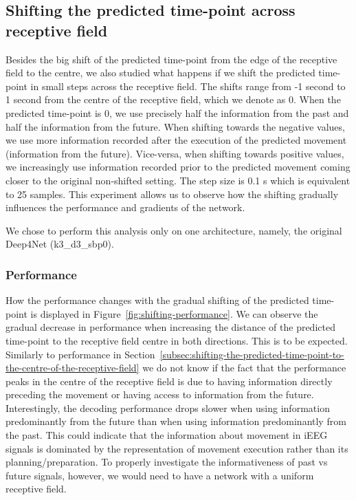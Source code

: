 \subsection{Shifting the predicted time-point across receptive field}\label{subsec:shifting-the-predicted-time-point-across-receptive-field}
Besides the big shift of the predicted time-point from the edge of the receptive field to the centre, we also studied what happens if we shift the predicted time-point in small steps across the receptive field. 
The shifts range from  -1 second to 1 second from the centre of the receptive field, which we denote as 0.
When the predicted time-point is 0, we use precisely half the information from the past and half the information from the future.
When shifting towards the negative values, we use more information recorded after the execution of the predicted movement (information from the future). 
Vice-versa, when shifting towards positive values, we increasingly use information recorded prior to the predicted movement coming closer to the original non-shifted setting.  
The step size is 0.1 s which is equivalent to 25 samples.
This experiment allows us to observe how the shifting gradually influences the performance and gradients of the network. 

We chose to perform this analysis only on one architecture, namely, the original Deep4Net (k3\_d3\_sbp0). 

\subsubsection{Performance}\label{subsubsec:across-shiftig-performace}
How the performance changes with the gradual shifting of the predicted time-point is displayed in Figure~\ref{fig:shifting-performance}.
We can observe the gradual decrease in performance when increasing the distance of the predicted time-point to the receptive field centre in both directions. 
This is to be expected. 
Similarly to performance in Section~\ref{subsec:shifting-the-predicted-time-point-to-the-centre-of-the-receptive-field} we do not know if the fact that the performance peaks in the centre of the receptive field is due to having information directly preceding the movement or having access to information from the future. 
Interestingly, the decoding performance drops slower when using information predominantly from the future than when using information predominantly from the past. This could indicate that the information about movement in iEEG signals is dominated by the representation of movement execution rather than its planning/preparation. 
To properly investigate the informativeness of past vs future signals, however, we would need to have a network with a uniform receptive field. 

